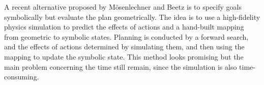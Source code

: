 

A recent alternative proposed by Mösenlechner and Beetz \citep{Msenlechner2009UsingPA}
is to specify goals symbolically but evaluate the plan geometrically.
The idea is to use a high-fidelity physics simulation to predict
the effects of actions and a hand-built mapping from geometric
to symbolic states. Planning is conducted by a forward search,
and the effects of actions determined by simulating them, and
then using the mapping to update the symbolic state. This method looks promising but the main problem concerning the time still remain, since the simulation is also time-consuming. 




